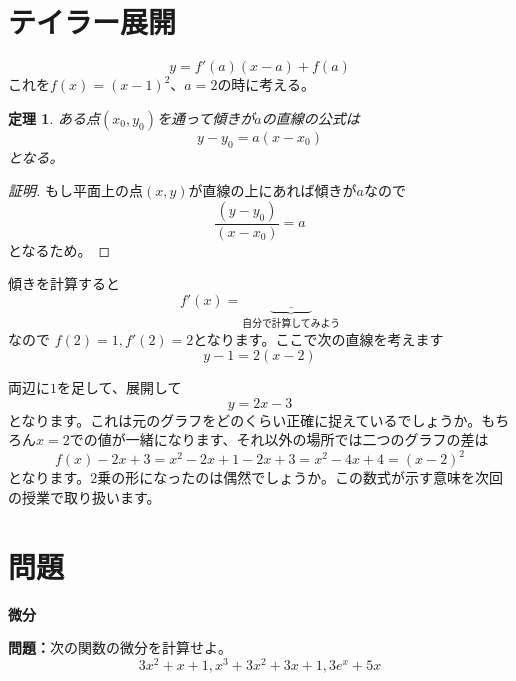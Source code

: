\documentclass{ltjsarticle}
\newtheorem{theorem}{定理}[section]
\begin{document}
\section{テイラー展開}
\begin{equation*}
y = f'(a)(x-a)+f(a)
\end{equation*}
これを$f(x) = (x-1)^2$、$a=2$の時に考える。
\begin{theorem}
ある点$(x_0,y_0)$を通って傾きが$a$の直線の公式は
\begin{equation*}
y-y_0 = a(x-x_0)
\end{equation*}
となる。
\end{theorem}
\begin{proof}[証明]
もし平面上の点$(x,y)$が直線の上にあれば傾きが$a$なので
\begin{equation*}
{\frac {(y-y_0)} {(x-x_0)}} = a
\end{equation*}
となるため。
\end{proof}
傾きを計算すると
\begin{equation*}
f'(x) = \underbrace{\underline{\quad\quad\quad}}_{\text{自分で計算してみよう}}
\end{equation*}
なので
$f(2) = 1,f'(2) = 2$となります。ここで次の直線を考えます
\begin{equation*}
y -1 = 2(x-2)
\end{equation*}

両辺に$1$を足して、展開して
\begin{equation*}
y = 2x-3
\end{equation*}
となります。これは元のグラフをどのくらい正確に捉えているでしょうか。もちろん$x=2$での値が一緒になります、それ以外の場所では二つのグラフの差は
\begin{equation*}
f(x) - 2x+3 = x^2-2x+1 - 2x +3 = x^2-4x+4 = (x-2)^2
\end{equation*}
となります。$2$乗の形になったのは偶然でしょうか。この数式が示す意味を次回の授業で取り扱います。
\section{問題}
\par\textbf{微分}
\par\textbf{問題：}次の関数の微分を計算せよ。
\begin{equation*}
3x^2+x+1,x^3+3x^2+3x+1,3e^x+5x
\end{equation*}
\end{document}
